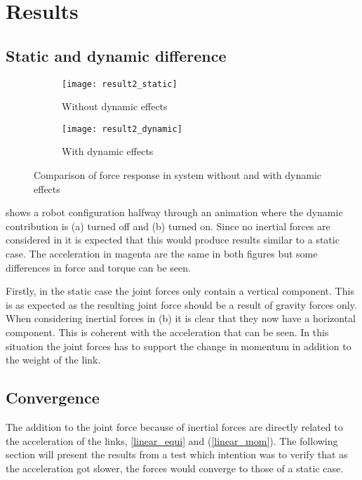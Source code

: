 \chapter{Results}

\section{Static and dynamic difference}

\begin{figure}[h!]
\begin{subfigure}[b]{0.5\textwidth}
    \centering
    \texttt{[image: result2\_static]}
    \caption{Without dynamic effects}
    \label{result_static}
\end{subfigure}
\hfill
\begin{subfigure}[b]{0.5\textwidth}
    \centering
    \texttt{[image: result2\_dynamic]}
    \caption{With dynamic effects}
\end{subfigure}
\caption{Comparison of force response in system without and with dynamic effects}
\label{result_img}
\end{figure}

 shows a robot configuration halfway through an animation where the dynamic contribution is (a) turned off and (b) turned on. Since no inertial forces are considered in  it is expected that this would produce results similar to a static case. The acceleration in magenta are the same in both figures but some differences in force and torque can be seen.

Firstly, in the static case the joint forces only contain a vertical component. This is as expected as the resulting joint force should be a result of gravity forces only. When considering inertial forces in (b) it is clear that they now have a horizontal component. This is coherent with the acceleration that can be seen. In this situation the joint forces has to support the change in momentum in addition to the weight of the link.

\section{Convergence}

The addition to the joint force because of inertial forces are directly related to the acceleration of the links,  \eqref{linear_equi} and (\ref{linear_mom}). The following section will present the results from a test which intention was to verify that as the acceleration got slower, the forces would converge to those of a static case.

